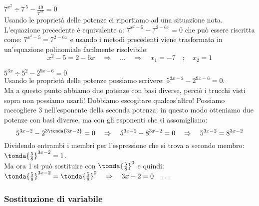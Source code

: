 \begin{esempio}\(7^{x^2} \div 7^{\,5} - \frac{49}{7^{6x}} = 0\)\\[4pt] 
Usando le proprietà delle potenze 
ci riportiamo ad una situazione nota. 
L'equazione precedente è equivalente a: 
\(7^{x^2-5} - 7^{2-6x} = 0\) che può essere riscritta come:
\(7^{x^2-5} = 7^{2-6x}\) e usando i metodi precedenti viene 
trasformata in un'equazione polinomiale facilmente risolvibile:
\[x^2-5 = 2-6x \quad\Rightarrow\quad \dots\quad \Rightarrow \quad x_1=-7 
\quad;\quad  x_2=1\]
\end{esempio}

\begin{esempio}
\({5}^{3x} \div 5^2-{2}^{9x-6}=0\)\\[4pt]
Usando le proprietà delle potenze possiamo scrivere: 
\({5}^{3x-2}-{2}^{9x-6}=0\).\\
Ma a questo punto abbiamo due potenze con basi diverse, perciò i trucchi 
visti sopra 
non possiamo usarli! Dobbiamo escogitare qualcos'altro! Possiamo 
raccogliere 3 nell'esponente della seconda potenza: in questo modo 
otteniamo due 
potenze con basi diverse, ma con gli esponenti che si assomigliano:
\[{5}^{3x-2}-{2}^{3\tonda{3x-2}}=0 \quad \Rightarrow \quad 
{5}^{3x-2}-{8}^{3x-2}=0 \quad 
\Rightarrow \quad {5}^{3x-2}={8}^{3x-2}\]
Dividendo entrambi i membri per l'espressione che si trova a secondo membro:
\(\tonda{\frac{5}{8}}^{3x-2}=1\).\\
Ma ora 1 si può sostituire con \(\tonda{\frac{5}{8}}^{0}\) e quindi:
\(\tonda{\frac{5}{8}}^{3x-2}=\tonda{\frac{5}{8}}^{0} \quad\Rightarrow\quad 
3x-2=0 \quad\dots\)
\end{esempio}

\subsubsection{Sostituzione di variabile}
\label{subsubsec:esplog_sostituzione}

